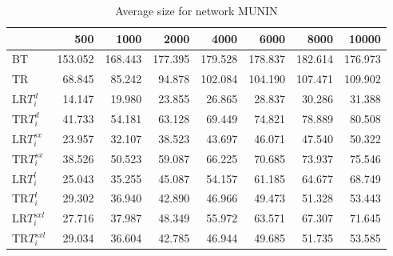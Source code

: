 \begin{table}
\begin{center}
\begin{tabular}{lrrrrrrr}
 & 500 & 1000 & 2000 & 4000 & 6000 & 8000 & 10000\\\hline
BT & 153.052 & 168.443 & 177.395 & 179.528 & 178.837 & 182.614 & 176.973\\\hline
TR & 68.845 & 85.242 & 94.878 & 102.084 & 104.190 & 107.471 & 109.902\\\hline
LR$T_i^d$ & 14.147 & 19.980 & 23.855 & 26.865 & 28.837 & 30.286 & 31.388\\\hline
TR$T_i^d$ & 41.733 & 54.181 & 63.128 & 69.449 & 74.821 & 78.889 & 80.508\\\hline
LR$T_i^{sx}$ & 23.957 & 32.107 & 38.523 & 43.697 & 46.071 & 47.540 & 50.322\\\hline
TR$T_i^{sx}$ & 38.526 & 50.523 & 59.087 & 66.225 & 70.685 & 73.937 & 75.546\\\hline
LR$T_i^l$ & 25.043 & 35.255 & 45.087 & 54.157 & 61.185 & 64.677 & 68.749\\\hline
TR$T_i^l$ & 29.302 & 36.940 & 42.890 & 46.966 & 49.473 & 51.328 & 53.443\\\hline
LR$T_i^{sxl}$ & 27.716 & 37.987 & 48.349 & 55.972 & 63.571 & 67.307 & 71.645\\\hline
TR$T_i^{sxl}$ & 29.034 & 36.604 & 42.785 & 46.944 & 49.685 & 51.735 & 53.585\\\hline
\end{tabular}
\end{center}
\caption{Average size for network MUNIN }
\label{Muninsi}
\end{table}
